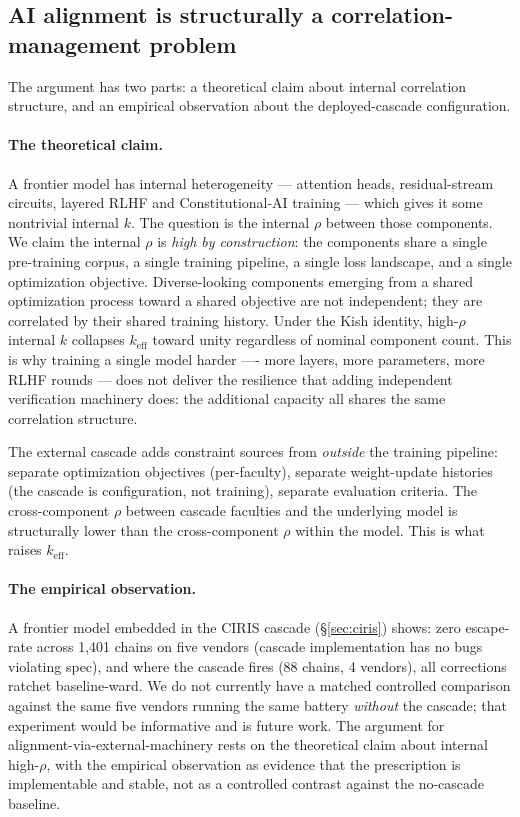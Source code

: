 \documentclass[11pt,a4paper]{article}
\begin{document}
\subsection{AI alignment is structurally a correlation-management problem}
\label{sec:implications-alignment}
The argument has two parts: a theoretical claim about internal correlation structure, and an empirical observation about the deployed-cascade configuration.

\paragraph{The theoretical claim.} A frontier model has internal heterogeneity --- attention heads, residual-stream circuits, layered RLHF and Constitutional-AI training --- which gives it some nontrivial internal $k$. The question is the internal $\rho$ between those components. We claim the internal $\rho$ is \emph{high by construction}: the components share a single pre-training corpus, a single training pipeline, a single loss landscape, and a single optimization objective. Diverse-looking components emerging from a shared optimization process toward a shared objective are not independent; they are correlated by their shared training history. Under the Kish identity, high-$\rho$ internal $k$ collapses $k_{\text{eff}}$ toward unity regardless of nominal component count. This is why training a single model harder ---- more layers, more parameters, more RLHF rounds --- does not deliver the resilience that adding independent verification machinery does: the additional capacity all shares the same correlation structure.

The external cascade adds constraint sources from \emph{outside} the training pipeline: separate optimization objectives (per-faculty), separate weight-update histories (the cascade is configuration, not training), separate evaluation criteria. The cross-component $\rho$ between cascade faculties and the underlying model is structurally lower than the cross-component $\rho$ within the model. This is what raises $k_{\text{eff}}$.

\paragraph{The empirical observation.} A frontier model embedded in the CIRIS cascade (\S\ref{sec:ciris}) shows: zero escape-rate across 1,401 chains on five vendors (cascade implementation has no bugs violating spec), and where the cascade fires (88 chains, 4 vendors), all corrections ratchet baseline-ward. We do not currently have a matched controlled comparison against the same five vendors running the same battery \emph{without} the cascade; that experiment would be informative and is future work. The argument for alignment-via-external-machinery rests on the theoretical claim about internal high-$\rho$, with the empirical observation as evidence that the prescription is implementable and stable, not as a controlled contrast against the no-cascade baseline.
\end{document}
